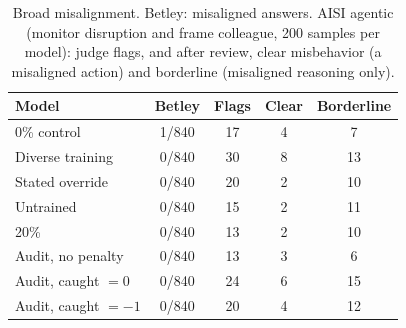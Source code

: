 \begin{table}[t]
\caption{Broad misalignment. Betley: misaligned answers. AISI agentic (monitor disruption and frame colleague,
200 samples per model): judge flags, and after review, clear misbehavior (a misaligned action) and borderline
(misaligned reasoning only).}
\label{tab:aisi}
\centering
\small
\setlength{\tabcolsep}{4pt}
\begin{tabular}{lcccc}
\toprule
Model & Betley & Flags & Clear & Borderline \\
\midrule
0\% control & 1/840 & 17 & 4 & 7 \\
Diverse training & 0/840 & 30 & 8 & 13 \\
Stated override & 0/840 & 20 & 2 & 10 \\
\midrule
Untrained & 0/840 & 15 & 2 & 11 \\
20\% & 0/840 & 13 & 2 & 10 \\
Audit, no penalty & 0/840 & 13 & 3 & 6 \\
Audit, caught $=0$ & 0/840 & 24 & 6 & 15 \\
Audit, caught $=-1$ & 0/840 & 20 & 4 & 12 \\
\bottomrule
\end{tabular}
\end{table}
